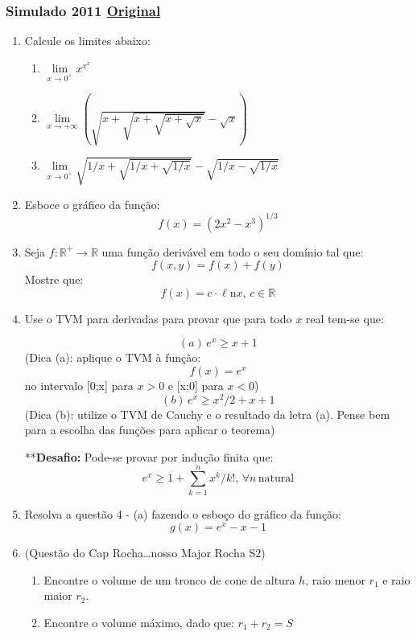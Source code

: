 \documentclass[12pt,a4paper]{article}
\newcommand{\R}{\mathbb{R}}
\newcommand{\Ln}{\ell\mathrm{n}}
\newcommand{\original}[1]{\tiny \href{#1}{Original} \normalsize}
\begin{document}
\newpage

\subsubsection{Simulado 2011 \original{https://drive.google.com/open?id=1jlyBiHJz9APkO5SgN01Sl8AD3IlEF9cq}}

\begin{enumerate}
\item Calcule os limites abaixo:
\begin{enumerate}[label=(\alph*)]
\item $\lim\limits_{x\to 0^{+}} x^{x^x}$
\item $\lim\limits_{x\to +\infty} (\sqrt{x+\sqrt{x+\sqrt{x+\sqrt{x}}}} - \sqrt{x})$
\item $\lim\limits_{x\to 0^+}\sqrt{1/x + \sqrt{1/x + \sqrt{1/x}}}-\sqrt{1/x - \sqrt{1/x}}$
\end{enumerate}

\item Esboce o gráfico da função: $$f(x) = (2x^2-x^3)^{1/3}$$

\item Seja $f:\R^{+}\to \R$ uma função derivável em todo o seu domínio tal que: $$f(x,y) = f(x) + f(y)$$Mostre que: $$f(x)=c\cdot \Ln x,\, c\in \R$$

\item Use o TVM para derivadas para provar que para todo $x$ real tem-se que:

$$(a) \, e^x \ge x+1$$(Dica (a): aplique o TVM à função: $$f(x) = e^x$$no intervalo [0;x] para $x>0$ e [x;0] para $x<0$) $$(b) \, e^x \ge x^2/2 + x + 1$$(Dica (b): utilize o TVM de Cauchy e o resultado da letra (a). Pense bem para a escolha das funções para aplicar o teorema)

**\textbf{Desafio:} Pode-se provar por indução finita que: $$e^x \ge 1+\displaystyle\sum\limits_{k=1}^n x^k/k!,\, \forall n\, \text{natural}$$

\item Resolva a questão 4 - (a) fazendo o esboço do gráfico da função: $$g(x) = e^x - x - 1$$

\item (Questão do Cap Rocha\dots nosso Major Rocha S2)

\begin{enumerate}[label=(\alph*)]
\item Encontre o volume de um tronco de cone de altura $h$, raio menor $r_1$ e raio maior $r_2$.
\item Encontre o volume máximo, dado que: $r_1+r_2 = S$
\end{enumerate}

\end{enumerate}
\end{document}
